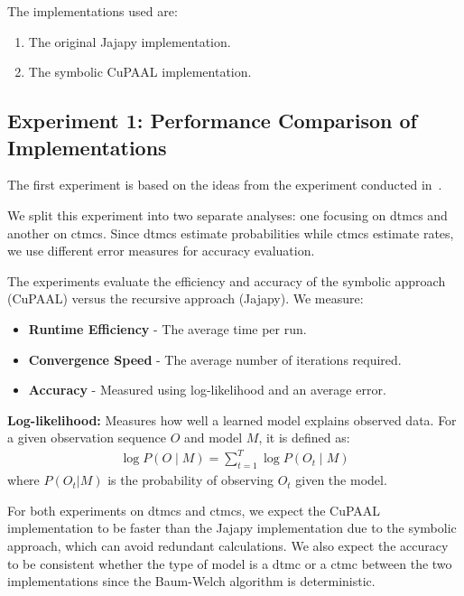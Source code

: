 The implementations used are:
\begin{enumerate}
    \item The original Jajapy implementation.
    \item The symbolic CuPAAL implementation.
\end{enumerate}

\subsection{Experiment 1: Performance Comparison of Implementations}
The first experiment is based on the ideas from the experiment conducted in~\cite{reynouard2024learning}.

We split this experiment into two separate analyses: one focusing on \glspl{dtmc} and another on \glspl{ctmc}. Since \glspl{dtmc} estimate probabilities while \glspl{ctmc} estimate rates, we use different error measures for accuracy evaluation.

The experiments evaluate the efficiency and accuracy of the symbolic approach (CuPAAL) versus the recursive approach (Jajapy). We measure:
\begin{itemize}
    \item \textbf{Runtime Efficiency} - The average time per run.
    \item \textbf{Convergence Speed} - The average number of iterations required.
    \item \textbf{Accuracy} - Measured using log-likelihood and an average error.
\end{itemize}

\textbf{Log-likelihood:} Measures how well a learned model explains observed data.
For a given observation sequence $O$ and model $M$, it is defined as:
\begin{equation}
    \begin{aligned}
        \log P(O \mid M) = \sum_{t=1}^{T} \log P(O_t \mid M)
    \end{aligned}
\end{equation}
where $P(O_t|M)$ is the probability of observing $O_t$ given the model.

For both experiments on \glspl{dtmc} and \glspl{ctmc}, we expect the CuPAAL implementation to be faster than the Jajapy implementation due to the symbolic approach, which can avoid redundant calculations.
We also expect the accuracy to be consistent whether the type of model is a \gls{dtmc} or a \gls{ctmc} between the two implementations since the Baum-Welch algorithm is deterministic.

